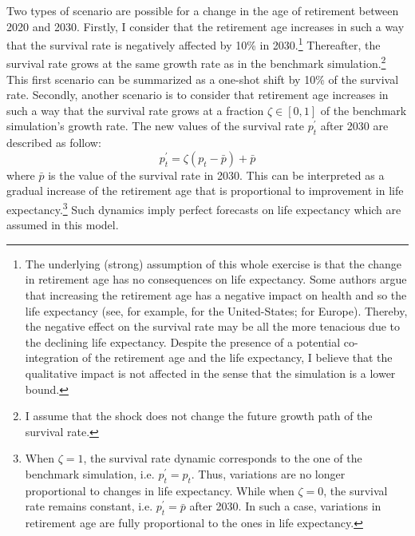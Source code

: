 Two types of scenario are possible for a change in the age of retirement between 2020 and 2030. Firstly, I consider that the retirement age increases in such a way that the survival rate is negatively affected by 10\% in 2030.\footnote{The underlying (strong) assumption of this whole exercise is that the change in retirement age has no consequences on life expectancy. Some authors argue that increasing the retirement age has a negative impact on health and so the life expectancy (see, for example, \cite{Insler2014} for the United-States; \cite{Coe2011} for Europe). Thereby, the negative effect on the survival rate may be all the more tenacious due to the declining life expectancy. Despite the presence of a potential co-integration of the retirement age and the life expectancy, I believe that the qualitative impact is not affected in the sense that the simulation is a lower bound.} Thereafter, the survival rate grows at the same growth rate as in the benchmark simulation.\footnote{I assume that the shock does not change the future growth path of the survival rate.} This first scenario can be summarized as a one-shot shift by 10\% of the survival rate. Secondly, another scenario is to consider that retirement age increases in such a way that the survival rate grows at a fraction $\zeta \in \left[0,1\right]$ of the benchmark simulation's growth rate. The new values of the survival rate $p^\prime_t$ after 2030 are described as follow:
\begin{equation*}
	p^\prime_t = \zeta(p_t - \bar{p}) + \bar{p}
\end{equation*}
where $\bar{p}$ is the value of the survival rate in 2030. This can be interpreted as a gradual increase of the retirement age that is proportional to improvement in life expectancy.\footnote{When $\zeta = 1$, the survival rate dynamic corresponds to the one of the benchmark simulation, i.e. $p_t^\prime = p_t$. Thus, variations are no longer proportional to changes in life expectancy. While when $\zeta = 0$, the survival rate remains constant, i.e. $p_t^\prime = \bar{p}$ after 2030. In such a case, variations in retirement age are fully proportional to the ones in life expectancy.} Such dynamics imply perfect forecasts on life expectancy which are assumed in this model.

